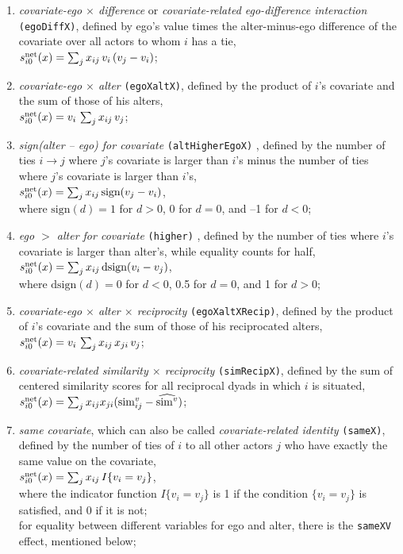 \documentclass[a4paper,fleqn,11pt]{article}
\newcommand{\+}{\, + \,}
\newcommand{\vit}{\theenumi}
\begin{document}
\begin{enumerate}
 \item {\em covariate-ego $\times$ difference} or {\em covariate-related ego-difference interaction}
 \texttt{(egoDiffX)},
 defined by ego's value times the alter-minus-ego difference of the covariate over all actors
 to whom $i$ has a tie,\\
 $s^{\rm net}_{i\vit}(x) = \sum_j x_{ij}\, v_i \, (v_j - v_i)$;


 \item {\em covariate-ego $\times$ alter} \texttt{(egoXaltX)},
 defined by the product of $i$'s covariate and the sum of those of his alters,\\
 $s^{\rm net}_{i\vit}(x) = v_i \, \sum_j x_{ij}\, v_j $;

 \item {\em sign(alter -- ego) for covariate} \texttt{(altHigherEgoX)} ,
 defined by the number of ties $i \rightarrow j$ where $j$'s covariate
 is larger than  $i$'s minus the number of ties
 where $j$'s covariate is larger than  $i$'s,\\
 $s^{\rm net}_{i\vit}(x) =  \sum_j x_{ij}\, \text{sign}(v_j - v_i) $,\\
 where $\text{sign}(d) = 1$ for $d > 0$, 0 for $d = 0$,
 and --1 for $d < 0$;

 \item {\em ego $>$ alter for covariate} \texttt{(higher)} ,
 defined by the number of ties where $i$'s covariate
 is larger than alter's, while equality counts for half,\\
 $s^{\rm net}_{i\vit}(x) =  \sum_j x_{ij}\, \text{dsign}(v_i - v_j) $,\\
 where $\text{dsign}(d) = 0$ for $d < 0$, 0.5 for $d = 0$,
 and 1 for $d > 0$;

 \item {\em covariate-ego $\times$ alter $\times$ reciprocity}
 \texttt{(egoXaltXRecip)},
 defined by the product of $i$'s covariate and the sum of those
 of his reciprocated alters,\\
 $s^{\rm net}_{i\vit}(x) = v_i \, \sum_j x_{ij}\,x_{ji}\, v_j $;

 \item {\em covariate-related similarity $\times$ reciprocity}
 \texttt{(simRecipX)}, defined by
 the sum of centered similarity scores for all
 reciprocal dyads in which $i$ is situated,\\
 $s^{\rm net}_{i\vit}(x) = \sum_j x_{ij}x_{ji} ({\rm sim}^v_{ij} - \widehat{{\rm sim}^v}) $;

 \item \emph{same covariate}, which can also be called {\em covariate-related identity}
 \texttt{(sameX)},  defined by the
 number of ties of $i$ to all other actors $j$ who have
 exactly the same value on the covariate,\\
 $s^{\rm net}_{i\vit}(x) = \sum_j x_{ij}\, I\{v_i = v_j \} $,\\
 where the indicator function $I\{v_i = v_j \} $ is 1 if the condition $\{v_i = v_j \} $
 is satisfied, and 0 if it is not;\\
 for equality between different variables for ego and alter,
 there is the \texttt{sameXV} effect, mentioned below;


\end{enumerate}
\end{document}
